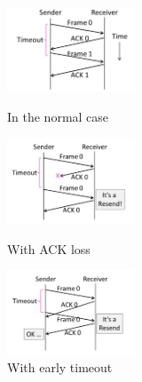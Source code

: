\documentclass[12pt]{ctexart}   %
\begin{document}
		\begin{figure}
			\begin{minipage}[t]{0.3\linewidth}
				\centering
				\includegraphics[width=1.5in]{images/3-2-5}
				\caption{ In the normal case}
				\label{fig:3-2-5}
			\end{minipage}
			\begin{minipage}[t]{0.3\linewidth}
				\centering
				\includegraphics[width=1.5in]{images/3-2-6}
				\caption{With ACK loss}
				\label{fig:3-2-6}
			\end{minipage}
			\begin{minipage}[t]{0.3\linewidth}
				\centering
				\includegraphics[width=1.5in]{images/3-2-7}
				\caption{With early timeout}
				\label{fig:3-2-7}
			\end{minipage}
		\end{figure}
	
\end{document}

